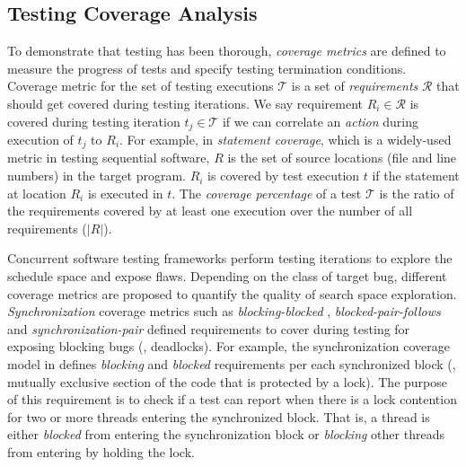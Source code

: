 \subsection{Testing Coverage Analysis}
\label{sec:coverage}
To demonstrate that testing has been thorough, \textit{coverage metrics} are defined to measure the progress of tests and specify testing termination conditions.
%
Coverage metric for the set of testing executions $\mathcal{T}$ is a set of \textit{requirements} $\mathcal{R}$ that should get covered during testing iterations.
%
We say requirement $R_i \in \mathcal{R}$ is covered during testing iteration $t_j \in \mathcal{T}$ if we can correlate an \textit{action} during execution of $t_j$ to $R_i$.
%
For example, in \textit{statement coverage}, which is a widely-used metric in testing sequential software, $R$ is the set of source locations (file and line numbers) in the target program.
%
$R_i$ is covered by test execution $t$ if the statement at location $R_i$ is executed in $t$.
%
The \textit{coverage percentage} of a test $\mathcal{T}$ is the ratio of the requirements covered by at least one execution over the number of all requirements ($|R|$).

Concurrent software testing frameworks perform testing iterations to explore the schedule space and expose flaws.
%
Depending on the class of target bug, different coverage metrics are proposed to quantify the quality of search space exploration.
%
\textit{Synchronization} coverage metrics such as \textit{blocking-blocked} \cite{edelstein2003contest}, \textit{blocked-pair-follows} \cite{trainin-followsCoverage-padtad09} and \textit{synchronization-pair} \cite{hong-syncTesting-issta12} defined requirements to cover during testing for exposing blocking bugs (\eg, deadlocks).
%
%
For example, the synchronization coverage model in \cite{edelstein2003contest} defines \textit{blocking} and \textit{blocked} requirements per each synchronized block (\ie, mutually exclusive section of the code that is protected by a lock).
%
The purpose of this requirement is to check if a test can report when there is a lock contention for two or more threads entering the synchronized block.
%
That is, a thread is either \textit{blocked} from entering the synchronization block or \textit{blocking} other threads from entering by holding the lock.
%





